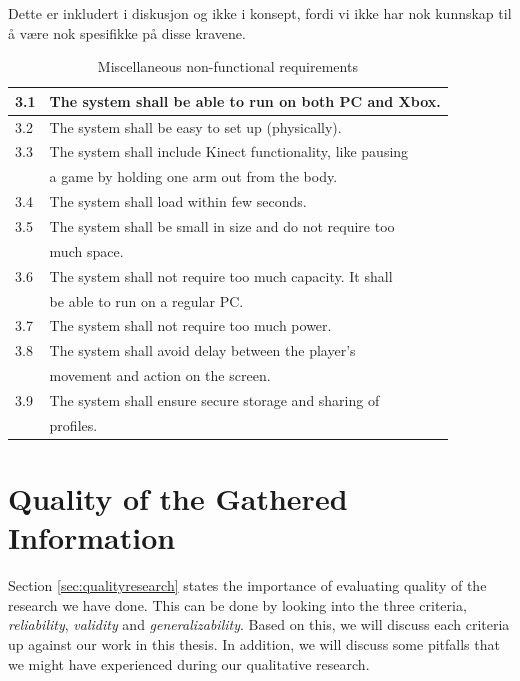 Dette er inkludert i diskusjon og ikke i konsept, fordi vi ikke har nok kunnskap til å være nok spesifikke på disse kravene. 

\begin{table} [H]
\label{tab:nfunc2}
\centering
\begin{tabular}{|l|l|}
\hline
3.1 & The system shall be able to run on both PC and Xbox. \\ \hline
3.2 & The system shall be easy to set up (physically).\\ \hline
3.3 & The system shall include Kinect functionality, like pausing \\ & a game by holding one arm out from the body. \\ \hline
3.4 & The system shall load within few seconds.\\ \hline
3.5 & The system shall be small in size and do not require too \\&  much space.\\ \hline
3.6 & The system shall not require too much capacity. It shall \\ & be able to run on a regular PC. \\ \hline
3.7 & The system shall not require too much power. \\ \hline
3.8 & The system shall avoid delay between the player's \\ & movement and action on the screen.\\ \hline
3.9 & The system shall ensure secure storage and sharing of \\ & profiles. \\ \hline
\end{tabular}
\caption[Miscellaneous non-functional requirements]{Miscellaneous non-functional requirements}
\end{table} 

\section{Quality of the Gathered Information}
\label{sec:discQuality}

Section \ref{sec:qualityresearch} states the importance of evaluating quality of the research we have done. This can be done by looking into the three criteria, \emph{reliability}, \emph{validity} and \emph{generalizability}. Based on this, we will discuss each criteria up against our work in this thesis. In addition, we will discuss some pitfalls that we might have experienced during our qualitative research.  

